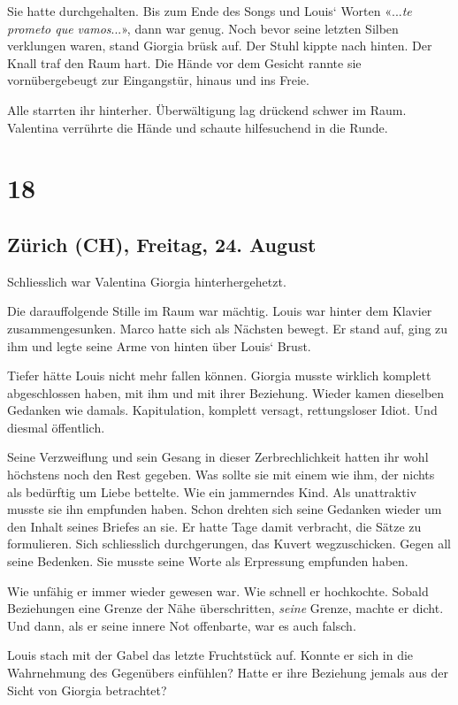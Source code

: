 Sie hatte durchgehalten. Bis zum Ende des Songs und Louis` Worten
«...\emph{te prometo que vamos}...», dann war genug. Noch bevor seine
letzten Silben verklungen waren, stand Giorgia brüsk auf. Der Stuhl
kippte nach hinten. Der Knall traf den Raum hart. Die Hände vor dem
Gesicht rannte sie vornübergebeugt zur Eingangstür, hinaus und ins
Freie.

Alle starrten ihr hinterher. Überwältigung lag drückend schwer im Raum.
Valentina verrührte die Hände und schaute hilfesuchend in die Runde.

\chapter{18}\label{section-17}

\section{Zürich (CH), Freitag, 24.
August}\label{zuxfcrich-ch-freitag-24.-august}

Schliesslich war Valentina Giorgia hinterhergehetzt.

Die darauffolgende Stille im Raum war mächtig. Louis war hinter dem
Klavier zusammengesunken. Marco hatte sich als Nächsten bewegt. Er stand
auf, ging zu ihm und legte seine Arme von hinten über Louis` Brust.

Tiefer hätte Louis nicht mehr fallen können. Giorgia musste wirklich
komplett abgeschlossen haben, mit ihm und mit ihrer Beziehung. Wieder
kamen dieselben Gedanken wie damals. Kapitulation, komplett versagt,
rettungsloser Idiot. Und diesmal öffentlich.

Seine Verzweiflung und sein Gesang in dieser Zerbrechlichkeit hatten ihr
wohl höchstens noch den Rest gegeben. Was sollte sie mit einem wie ihm,
der nichts als bedürftig um Liebe bettelte. Wie ein jammerndes Kind. Als
unattraktiv musste sie ihn empfunden haben. Schon drehten sich seine
Gedanken wieder um den Inhalt seines Briefes an sie. Er hatte Tage damit
verbracht, die Sätze zu formulieren. Sich schliesslich durchgerungen,
das Kuvert wegzuschicken. Gegen all seine Bedenken. Sie musste seine
Worte als Erpressung empfunden haben.

Wie unfähig er immer wieder gewesen war. Wie schnell er hochkochte.
Sobald Beziehungen eine Grenze der Nähe überschritten, \emph{seine}
Grenze, machte er dicht. Und dann, als er seine innere Not offenbarte,
war es auch falsch.

Louis stach mit der Gabel das letzte Fruchtstück auf. Konnte er sich in
die Wahrnehmung des Gegenübers einfühlen? Hatte er ihre Beziehung jemals
aus der Sicht von Giorgia betrachtet?

